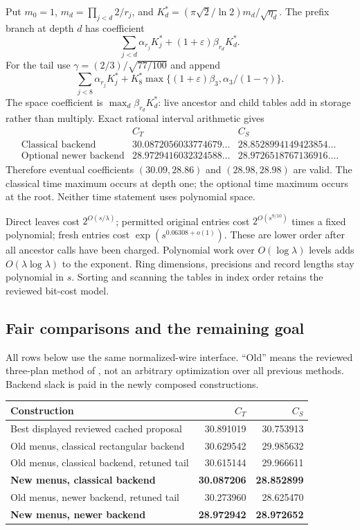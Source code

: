 Put $m_0=1$, $m_d=\prod_{j<d}2/r_j$, and
$K_d^*=(\pi\sqrt2/\ln2)m_d/\sqrt{\eta_d}$.
The prefix branch at depth $d$ has coefficient
\[
 \sum_{j<d}\alpha_{r_j}K_j^*+(1+\varepsilon)\beta_{r_d}K_d^*.
\]
For the tail use $\gamma=(2/3)/\sqrt{77/100}$ and append
\[
 \sum_{j<8}\alpha_{r_j}K_j^*
 +K_8^*\max\{(1+\varepsilon)\beta_3,\alpha_3/(1-\gamma)\}.
\]
The space coefficient is $\max_d\beta_{r_d}K_d^*$: live ancestor and child
tables add in storage rather than multiply. Exact rational interval arithmetic
gives
\[
\begin{array}{lrr}
& C_T&C_S\\
\text{Classical backend}&30.0872056033774679\ldots&28.8528994149423854\ldots\\
\text{Optional newer backend}&28.9729416032324588\ldots&28.9726518767136916\ldots.
\end{array}
\]
Therefore eventual coefficients $(30.09,28.86)$ and $(28.98,28.98)$ are valid.
The classical time maximum occurs at depth one; the optional time maximum
occurs at the root. Neither time statement uses polynomial space.

Direct leaves cost $2^{O(s/\lambda)}$; permitted original entries cost
$2^{O(s^{9/10})}$ times a fixed polynomial; fresh entries cost
$\exp(s^{0.06308+o(1)})$. These are lower order after all ancestor calls
have been charged. Polynomial work over $O(\log\lambda)$ levels adds
$O(\lambda\log\lambda)$ to the exponent. Ring dimensions, precisions and
record lengths stay polynomial in $s$. Sorting and scanning the tables in
index order retains the reviewed bit-cost model.

\subsection{Fair comparisons and the remaining goal}

All rows below use the same normalized-wire interface. ``Old'' means
the reviewed three-plan method of \cite{treenew}, not an arbitrary
optimization over all previous methods. Backend slack is paid in the
newly composed constructions.

\begin{center}\small
\begin{tabular}{p{8.3cm}rr}
\toprule Construction & $C_T$ & $C_S$\\\midrule
Best displayed reviewed cached proposal &30.891019&30.753913\\
Old menus, classical rectangular backend &30.629542&29.985632\\
Old menus, classical backend, retuned tail &30.615144&29.966611\\
\textbf{New menus, classical backend} &\textbf{30.087206}&\textbf{28.852899}\\
Old menus, newer backend, retuned tail &30.273960&28.625470\\
\textbf{New menus, newer backend} &\textbf{28.972942}&\textbf{28.972652}\\
\bottomrule
\end{tabular}
\end{center}

